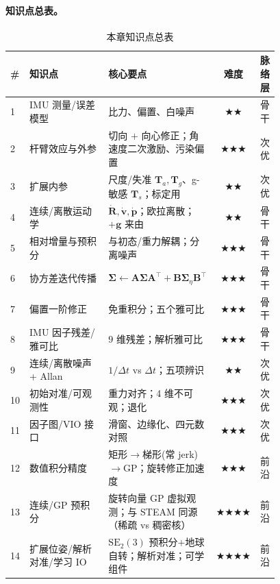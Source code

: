 \paragraph{知识点总表。}
\begin{table}[H]\centering\small
\caption{本章知识点总表}
\begin{tabular}{p{0.04\linewidth}p{0.40\linewidth}p{0.34\linewidth}cc}
\toprule
\# & 知识点 & 核心要点 & 难度 & 脉络层 \\
\midrule
1 & IMU 测量/误差模型 & 比力、偏置、白噪声 & \(\bigstar\bigstar\) & 骨干 \\
2 & 杆臂效应与外参 & 切向 $+$ 向心修正；角速度二次激励、污染偏置 & \(\bigstar\bigstar\bigstar\) & 次优 \\
3 & 扩展内参 & 尺度/失准 $\mathbf T_a,\mathbf T_g$、g-敏感 $\mathbf T_s$；标定用 & \(\bigstar\bigstar\) & 次优 \\
4 & 连续/离散运动学 & $\dot{\mathbf R},\dot{\mathbf v},\dot{\mathbf p}$；欧拉离散；$+\mathbf g$ 来由 & \(\bigstar\bigstar\) & 骨干 \\
5 & 相对增量与预积分 & 与初态/重力解耦；分离噪声 & \(\bigstar\bigstar\bigstar\) & 骨干 \\
6 & 协方差迭代传播 & $\boldsymbol\Sigma\leftarrow\mathbf A\boldsymbol\Sigma\mathbf A^\top+\mathbf B\boldsymbol\Sigma_\eta\mathbf B^\top$ & \(\bigstar\bigstar\bigstar\) & 骨干 \\
7 & 偏置一阶修正 & 免重积分；五个雅可比 & \(\bigstar\bigstar\bigstar\) & 骨干 \\
8 & IMU 因子残差/雅可比 & $9$ 维残差；解析雅可比 & \(\bigstar\bigstar\bigstar\) & 骨干 \\
9 & 连续/离散噪声 + Allan & $1/\Delta t$ vs $\Delta t$；五项辨识 & \(\bigstar\bigstar\) & 次优 \\
10 & 初始对准/可观测性 & 重力对齐；4 维不可观；退化 & \(\bigstar\bigstar\bigstar\) & 次优 \\
11 & 因子图/VIO 接口 & 滑窗、边缘化、四元数对照 & \(\bigstar\bigstar\bigstar\) & 次优 \\
12 & 数值积分精度 & 矩形$\to$梯形(常 jerk)$\to$GP；旋转修正加速度 & \(\bigstar\bigstar\bigstar\) & 前沿 \\
13 & 连续/GP 预积分 & 旋转向量 GP 虚拟观测；与 STEAM 同源（稀疏 vs 稠密核）& \(\bigstar\bigstar\bigstar\bigstar\) & 前沿 \\
14 & 扩展位姿/解析对准/学习 IO & $\mathrm{SE}_2(3)$ 预积分$+$地球自转；解析对准；可学组件 & \(\bigstar\bigstar\bigstar\bigstar\) & 前沿 \\
\bottomrule
\end{tabular}
\end{table}

